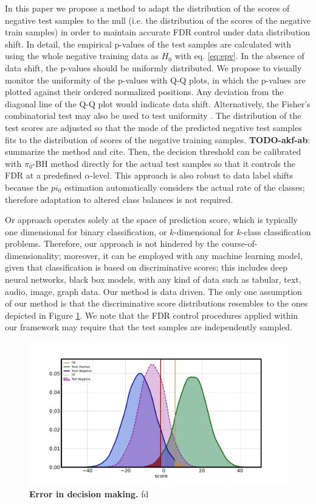 \documentclass{article}
\newcommand{\todo}[2]{{\color{red} {\bf TODO-#1}: #2}}
\begin{document}
In this paper we propose a method to adapt the distribution of the scores of negative test samples to the null (i.e. the distribution of the scores of the negative train samples) in order to maintain accurate FDR control under data distribution shift. In detail, the empirical p-values of the test samples are calculated with using the whole negative training data as $H_0$ with eq. \ref{eq:epv}. In the absence of data shift, the p-values should be uniformly distributed. We propose to visually monitor the uniformity of the p-values with Q-Q plots, in which the p-values are plotted against their ordered normalized positions. Any deviation from the diagonal line of the Q-Q plot would indicate data shift. Alternatively, the Fisher's combinatorial test may also be used to test uniformity \cite{fisher1928statistical}. The distribution of the test scores are adjusted so that the mode of the predicted negative test samples fits to the distribution of scores of the negative training samples. \todo{akf-ab}{summarize the method and cite}. Then, the decision threshold can be calibrated with $\pi_0$-BH method directly for the actual test samples so that it controls the FDR at a predefined $\alpha$-level. This approach is also robust to data label shifts because the $pi_0$ estimation automatically considers the actual rate of the classes; therefore adaptation to altered class balances is not required.

 Or approach operates solely at the space of prediction score, which is typically one dimensional for binary classification, or $k$-dimensional for $k$-class classification problems. Therefore, our approach is not hindered by the course-of-dimensionality; moreover, it can be employed with any machine learning model, given that classification is based on discriminative scores; this includes deep neural networks, black box models, with any kind of data such as tabular, text, audio, image, graph data. Our method is data driven. The only one assumption of our method is that the discriminative score distributions resembles to the ones depicted in Figure \ref{fig:illustration}. We note that the FDR control procedures applied within our framework may require that the test samples are independently sampled.

\begin{figure}
	\centering
	\includegraphics[width=5in]{img/synthetic_overview.pdf}
	\caption{{\bf Error in decision making.} fd}
	\label{fig:illustration}
\end{figure}  
\end{document}
